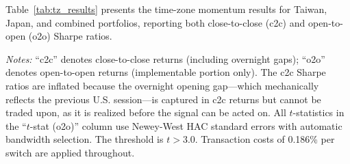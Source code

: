 Table~\ref{tab:tz_results} presents the time-zone momentum results for Taiwan, Japan, and combined portfolios, reporting both close-to-close (c2c) and open-to-open (o2o) Sharpe ratios.

\begin{table}[H]
\centering
\caption{Time-Zone Momentum Strategy Performance: Close-to-Close vs.\ Open-to-Open}
\label{tab:tz_results}
\begin{flushleft}
\small \textit{Notes:} ``c2c'' denotes close-to-close returns (including overnight gaps); ``o2o'' denotes open-to-open returns (implementable portion only). The c2c Sharpe ratios are inflated because the overnight opening gap---which mechanically reflects the previous U.S. session---is captured in c2c returns but cannot be traded upon, as it is realized before the signal can be acted on. All $t$-statistics in the ``$t$-stat (o2o)'' column use Newey-West HAC standard errors with automatic bandwidth selection. The \citet{harvey2016} threshold is $t > 3.0$. Transaction costs of 0.186\% per switch are applied throughout.
\end{flushleft}
\end{table}

